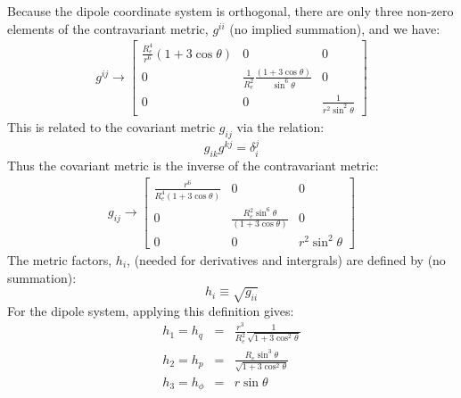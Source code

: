 \documentclass[11pt,letterpaper]{article}
\begin{document}
Because the dipole coordinate system is orthogonal, there are only three non-zero elements of the contravariant metric, $g^{ii}$ (no implied summation), and we have:
\begin{eqnarray}
g^{ij} \rightarrow \left[
\begin{array}{ccc}
\frac{R_e^4}{r^6} \left( 1 + 3 \cos \theta \right) & 0 & 0 \\ 
0 & \frac{1}{R_e^2} \frac{\left( 1+3 \cos \theta \right)}{\sin^6 \theta} & 0 \\
0 & 0 & \frac{1}{r^2 \sin^2 \theta}
\end{array}
\right] 
\end{eqnarray}
This is related to the covariant metric $g_{ij}$ via the relation:
\begin{equation}
g_{ik} g^{kj} = \delta_i^j
\end{equation}
Thus the covariant metric is the inverse of the contravariant metric:
\begin{eqnarray}
g_{ij} \rightarrow \left[
\begin{array}{ccc}
\frac{r^6}{R_e^4 \left( 1 + 3 \cos \theta \right)} & 0 & 0 \\ 
0 & \frac{R_e ^2 \sin^6 \theta}{\left( 1+3 \cos \theta \right)} & 0 \\
0 & 0 & r^2 \sin^2 \theta
\end{array}
\right] 
\end{eqnarray}
The metric factors, $h_i$, (needed for derivatives and intergrals) are defined by (no summation):
\begin{equation}
h_i \equiv \sqrt{g_{ii}}
\end{equation}
For the dipole system, applying this definition gives:  
\begin{eqnarray}
h_1 = h_q &=& \frac{r^3}{R_e^2} \frac{1}{\sqrt{1+3 \cos^2 \theta}} \\
h_2 = h_p &=& \frac{R_e \sin^3 \theta}{\sqrt{1+3 \cos^2 \theta}} \\
h_3 = h_\phi &=& r \sin \theta
\end{eqnarray}
\end{document}
